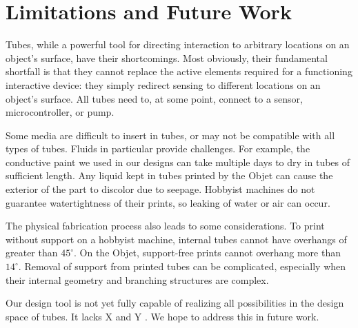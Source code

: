 \section{Limitations and Future Work}
Tubes, while a powerful tool for directing interaction to arbitrary locations on an object's surface, have their shortcomings.  Most obviously, their fundamental shortfall is that they cannot replace the active elements required for a functioning interactive device: they simply redirect sensing to different locations on an object's surface.  All tubes need to, at some point, connect to a sensor, microcontroller, or pump.

Some media are difficult to insert in tubes, or may not be compatible with all types of tubes.  Fluids in particular provide challenges.  For example, the conductive paint we used in our designs can take multiple days to dry in tubes of sufficient length.  Any liquid kept in tubes printed by the Objet can cause the exterior of the part to discolor due to seepage.  Hobbyist machines do not guarantee watertightness of their prints, so leaking of water or air can occur.

The physical fabrication process also leads to some considerations.  To print without support on a hobbyist machine, internal tubes cannot have overhangs of greater than $45^{\circ}$.  On the Objet, support-free prints cannot overhang more than $14^{\circ}$.  Removal of support from printed tubes can be complicated, especially when their internal geometry and branching structures are complex.

Our design tool is not yet fully capable of realizing all possibilities in the design space of tubes.  It lacks X and Y .  We hope to address this in future work.

